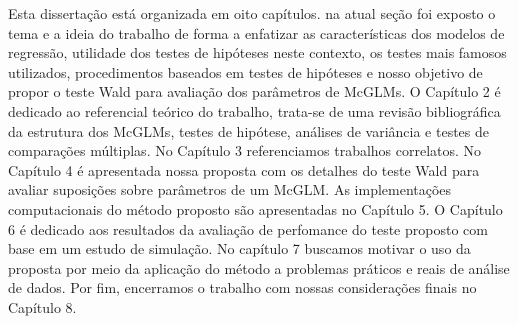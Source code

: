 Esta dissertação está organizada em oito capítulos. na atual seção foi exposto o tema e a ideia do trabalho de forma a enfatizar as características dos modelos de regressão, utilidade dos testes de hipóteses neste contexto, os testes mais famosos utilizados, procedimentos baseados em testes de hipóteses e nosso objetivo de propor o teste Wald para avaliação dos parâmetros de McGLMs. O Capítulo 2 é dedicado ao referencial teórico do trabalho, trata-se de uma revisão bibliográfica da estrutura dos McGLMs, testes de hipótese, análises de variância e testes de comparações múltiplas. No Capítulo 3 referenciamos trabalhos correlatos. No Capítulo 4 é apresentada nossa proposta com os detalhes do teste Wald para avaliar suposições sobre parâmetros de um McGLM. As implementações computacionais do método proposto são apresentadas no Capítulo 5. O Capítulo 6 é dedicado aos resultados da avaliação de perfomance do teste proposto com base em um estudo de simulação. No capítulo 7 buscamos motivar o uso da proposta por meio da aplicação do método a problemas práticos e reais de análise de dados. Por fim, encerramos o trabalho com nossas considerações finais no Capítulo 8.

